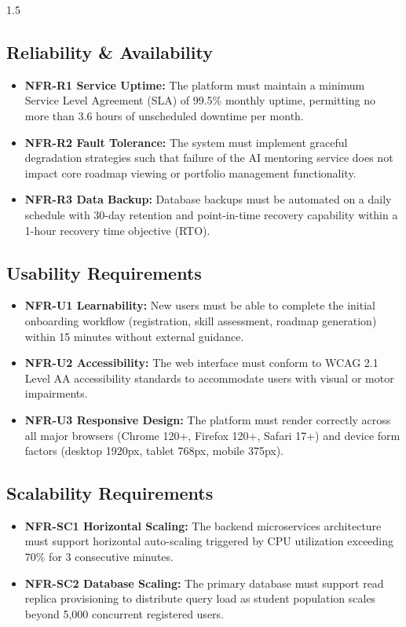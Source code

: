 \documentclass[12pt,a4paper]{report}
\begin{document}
\begin{spacing}{1.5}
		\subsection{Reliability \& Availability}
		
		\begin{itemize}
			\item \textbf{NFR-R1 Service Uptime:} The platform must maintain a minimum Service Level Agreement (SLA) of 99.5\% monthly uptime, permitting no more than 3.6 hours of unscheduled downtime per month.
			\item \textbf{NFR-R2 Fault Tolerance:} The system must implement graceful degradation strategies such that failure of the AI mentoring service does not impact core roadmap viewing or portfolio management functionality.
			\item \textbf{NFR-R3 Data Backup:} Database backups must be automated on a daily schedule with 30-day retention and point-in-time recovery capability within a 1-hour recovery time objective (RTO).
		\end{itemize}
		
		\subsection{Usability Requirements}
		
		\begin{itemize}
			\item \textbf{NFR-U1 Learnability:} New users must be able to complete the initial onboarding workflow (registration, skill assessment, roadmap generation) within 15 minutes without external guidance.
			\item \textbf{NFR-U2 Accessibility:} The web interface must conform to WCAG 2.1 Level AA accessibility standards to accommodate users with visual or motor impairments.
			\item \textbf{NFR-U3 Responsive Design:} The platform must render correctly across all major browsers (Chrome 120+, Firefox 120+, Safari 17+) and device form factors (desktop 1920px, tablet 768px, mobile 375px).
		\end{itemize}
		
		\subsection{Scalability Requirements}
		
		\begin{itemize}
			\item \textbf{NFR-SC1 Horizontal Scaling:} The backend microservices architecture must support horizontal auto-scaling triggered by CPU utilization exceeding 70\% for 3 consecutive minutes.
			\item \textbf{NFR-SC2 Database Scaling:} The primary database must support read replica provisioning to distribute query load as student population scales beyond 5,000 concurrent registered users.
		\end{itemize}
		

\end{spacing}
\end{document}
